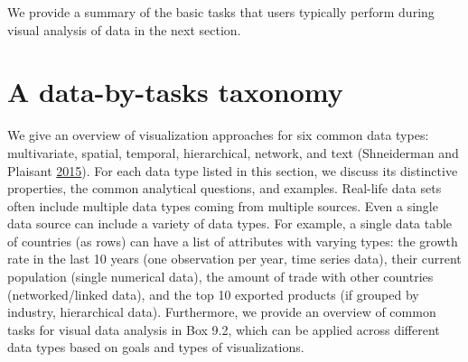 \documentclass[]{krantz}
\begin{document}
We provide a summary of the basic tasks that users typically perform
during visual analysis of data in the next section.

\vspace*{-3pt}

\section{A data-by-tasks taxonomy}\label{sec:viz-3}

We give an overview of visualization approaches for six common data
types: multivariate, spatial, temporal, hierarchical, network, and text
(Shneiderman and Plaisant
\protect\hyperlink{ref-shneiderman2015sharpening}{2015}). For each data
type listed in this section, we discuss its distinctive properties, the
common analytical questions, and examples. Real-life data sets often
include multiple data types coming from multiple sources. Even a single
data source can include a variety of data types. For example, a single
data table of countries (as rows) can have a list of attributes with
varying types: the growth rate in the last 10 years (one observation per
year, time series data), their current population (single numerical
data), the amount of trade with other countries (networked/linked data),
and the top 10 exported products (if grouped by industry, hierarchical
data). Furthermore, we provide an overview of common tasks for visual
data analysis in Box 9.2, which can be applied across different data
types based on goals and types of visualizations.
\end{document}
